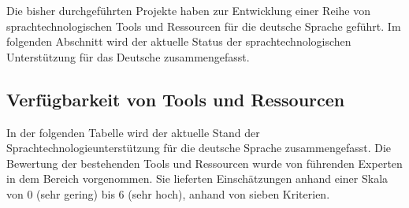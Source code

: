 \documentclass[]{../../metanetpaper}
\begin{document}
\begin{multicols}{2}
Die bisher durchgeführten Projekte haben zur Entwicklung einer Reihe von sprachtechnologischen Tools und Ressourcen für die deutsche Sprache geführt. Im folgenden Abschnitt wird der aktuelle Status der sprachtechnologischen Unterstützung für das Deutsche zusammengefasst.

\subsection{Verfügbarkeit von Tools und Ressourcen}

In der folgenden Tabelle wird der aktuelle Stand der Sprachtechnologieunterstützung für die deutsche Sprache zusammengefasst. Die Bewertung der bestehenden Tools und Ressourcen wurde von führenden Experten in dem Bereich vorgenommen. Sie lieferten Einschätzungen anhand einer Skala von 0 (sehr gering) bis 6 (sehr hoch), anhand von sieben Kriterien.


\end{multicols}
\end{document}
